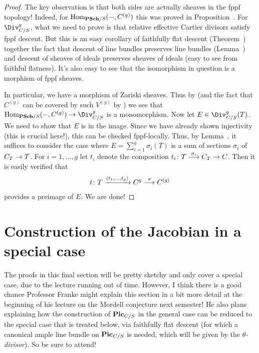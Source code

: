 \documentclass[a4paper,parskip=half,numbers=enddot, DIV=12]{scrreprt}
\begin{document}
\begin{proof}
	The key observation is that both sides are actually sheaves in the fppf topology! Indeed, for $\Hom_{\cat{PSch}/S}(-,C^{(g)})$ this was proved in Proposition~. For $\Div_{C/S}^g$, what we need to prove is that relative effective Cartier divisors satisfy fppf descent. But this is an easy corollary of faithfully flat descent (Theorem~) together the fact that descent of line bundles preserves line bundles (Lemma~) and descent of sheaves of ideals preserves sheaves of ideals (easy to see from faithful flatness). It's also easy to see that the isomorphism in question is a morphism of fppf sheaves.
	
	In particular, we have a morphism of Zariski sheaves. Thus by  (and the fact that $C^{(g)}$ can be covered by such $V^{(g)}$ by ) we see that $\Hom_{\cat{PSch}/S}(-,C^{(g)})\morphism\Div_{C/S}^g$ is a monomorphism. Now let $E\in \Div_{C/S}^g(T)$. We need to show that $E$ is in the image. Since we have already shown injectivity (this is crucial here!), this can be checked fppf-locally. Thus, by Lemma~, it suffices to consider the case where $E=\sum_{i=1}^g\sigma_i(T)$ is a sum of sections $\sigma_i$ of $C_T\morphism T$. For $i=1,\ldots,g$ let $t_i$ denote the composition $t_i\colon T\morphism[\sigma_i]C_T\morphism C$. Then it is easily verified that
	\begin{align*}
		t\colon T\xrightarrow{(t_1,\ldots,t_g)} C^g\morphism[\pi]C^{(g)}
	\end{align*}
	provides a preimage of $E$. We are done!
\end{proof}

\section{Construction of the Jacobian in a special case}
The proofs in this final section will be pretty sketchy and only cover a special case, due to the lecture running out of time. However, I think there is a good chance Professor Franke might explain this section in a bit more detail at the beginning of his lecture on the Mordell conjecture next semester! He also plans explaining how the construction of $\mathbf{Pic}_{C/S}$ in the general case can be reduced to the special case that is treated below, via faithfully flat descent (for which a canonical ample line bundle on $\mathbf{Pic}_{C/S}$ is needed, which will be given by the \emph{$\theta$-divisor}). So be sure to attend!
\end{document}
